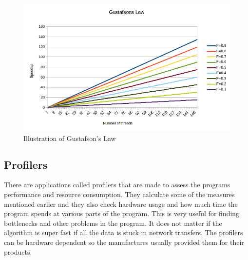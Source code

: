 \documentclass[10pt,a4paper]{report}
\begin{document}
\begin{figure}[h]
    \centering
    \includegraphics[width=13cm]{GustafsonsLaw.png}
    \caption{Illustration of Gustafson's Law}
    \label{fig:GustafsonsLaw}
\end{figure}

\subsection{Profilers}
There are applications called profilers that are made to assess the programs performance and resource consumption. They calculate some of the measures mentioned earlier and they also check hardware usage and how much time the program spends at various parts of the program. This is very useful for finding bottlenecks and other problems in the program. It does not matter if the algorithm is super fast if all the data is stuck in network transfers. The profilers can be hardware dependent so the manufactures usually provided them for their products.\cite{introduction_hpc_hager, cuda_best_practice}



\clearpage
\end{document}
